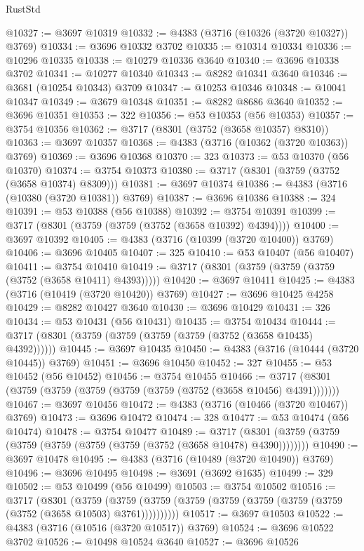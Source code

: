 \begin{lexlean}{RustStd}
\begin{coremodule}
@10327 := @3697 @10319
@10332 := @4383 (@3716 (@10326 (@3720 @10327)) @3769)
@10334 := @3696 @10332 @3702
@10335 := @10314 @10334
@10336 := @10296 @10335
@10338 := @10279 @10336 @3640
@10340 := @3696 @10338 @3702
@10341 := @10277 @10340
@10343 := @8282 @10341 @3640
@10346 := @3681 (@10254 @10343) @3709
@10347 := @10253 @10346
@10348 := @10041 @10347
@10349 := @3679 @10348
@10351 := @8282 @8686 @3640
@10352 := @3696 @10351
@10353 := 322
@10356 := @53 @10353 (@56 @10353)
@10357 := @3754 @10356
@10362 := @3717 (@8301 (@3752 (@3658 @10357) @8310))
@10363 := @3697 @10357
@10368 := @4383 (@3716 (@10362 (@3720 @10363)) @3769)
@10369 := @3696 @10368
@10370 := 323
@10373 := @53 @10370 (@56 @10370)
@10374 := @3754 @10373
@10380 := @3717 (@8301 (@3759 (@3752 (@3658 @10374) @8309)))
@10381 := @3697 @10374
@10386 := @4383 (@3716 (@10380 (@3720 @10381)) @3769)
@10387 := @3696 @10386
@10388 := 324
@10391 := @53 @10388 (@56 @10388)
@10392 := @3754 @10391
@10399 := @3717 (@8301 (@3759 (@3759 (@3752 (@3658 @10392) @4394))))
@10400 := @3697 @10392
@10405 := @4383 (@3716 (@10399 (@3720 @10400)) @3769)
@10406 := @3696 @10405
@10407 := 325
@10410 := @53 @10407 (@56 @10407)
@10411 := @3754 @10410
@10419 := @3717 (@8301 (@3759 (@3759 (@3759 (@3752 (@3658 @10411) @4393)))))
@10420 := @3697 @10411
@10425 := @4383 (@3716 (@10419 (@3720 @10420)) @3769)
@10427 := @3696 @10425 @4258
@10429 := @8282 @10427 @3640
@10430 := @3696 @10429
@10431 := 326
@10434 := @53 @10431 (@56 @10431)
@10435 := @3754 @10434
@10444 := @3717 (@8301 (@3759 (@3759 (@3759 (@3759 (@3752 (@3658 @10435) @4392))))))
@10445 := @3697 @10435
@10450 := @4383 (@3716 (@10444 (@3720 @10445)) @3769)
@10451 := @3696 @10450
@10452 := 327
@10455 := @53 @10452 (@56 @10452)
@10456 := @3754 @10455
@10466 := @3717 (@8301 (@3759 (@3759 (@3759 (@3759 (@3759 (@3752 (@3658 @10456) @4391)))))))
@10467 := @3697 @10456
@10472 := @4383 (@3716 (@10466 (@3720 @10467)) @3769)
@10473 := @3696 @10472
@10474 := 328
@10477 := @53 @10474 (@56 @10474)
@10478 := @3754 @10477
@10489 := @3717 (@8301 (@3759 (@3759 (@3759 (@3759 (@3759 (@3759 (@3752 (@3658 @10478) @4390))))))))
@10490 := @3697 @10478
@10495 := @4383 (@3716 (@10489 (@3720 @10490)) @3769)
@10496 := @3696 @10495
@10498 := @3691 (@3692 @1635)
@10499 := 329
@10502 := @53 @10499 (@56 @10499)
@10503 := @3754 @10502
@10516 := @3717
    (@8301
      (@3759 (@3759 (@3759 (@3759 (@3759 (@3759 (@3759 (@3759 (@3752 (@3658 @10503) @3761))))))))))
@10517 := @3697 @10503
@10522 := @4383 (@3716 (@10516 (@3720 @10517)) @3769)
@10524 := @3696 @10522 @3702
@10526 := @10498 @10524 @3640
@10527 := @3696 @10526

\end{coremodule}
\end{lexlean}
